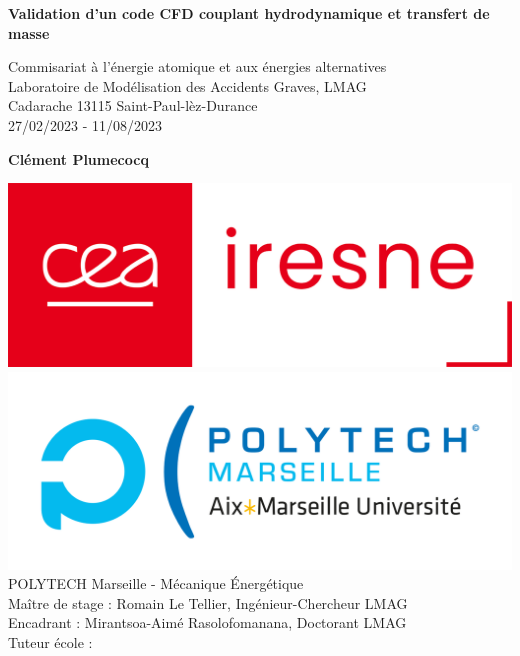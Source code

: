 \documentclass[a4paper,11pt,fleqn]{report}    %
\begin{document}

\hypersetup{pageanchor=false}
\begin{titlepage}
    \begin{center}
        \vspace*{1cm}

        \Huge
        \textbf{Validation d'un code CFD couplant hydrodynamique et transfert de masse}

        \vspace{0.5cm}
        \LARGE
        Commisariat à l'énergie atomique et aux énergies alternatives \\
        Laboratoire de Modélisation des Accidents Graves, LMAG\\
        \Large Cadarache 13115 Saint-Paul-lèz-Durance\\
         27/02/2023 - 11/08/2023
        \vspace{1.5cm}

        \textbf{\LARGE Clément Plumecocq}

        \vfill

        \includegraphics[scale=0.15]{logo_iresne.png}\includegraphics[scale=0.20]{polytech.jpg}
        \vfill
        \Large
        \noindent%
        POLYTECH Marseille - Mécanique Énergétique \\ \vfill
        Maître de stage : Romain Le Tellier, Ingénieur-Chercheur LMAG \\
        Encadrant : Mirantsoa-Aimé Rasolofomanana, Doctorant LMAG \\
        Tuteur école : 
    \end{center}
\end{titlepage}
\end{document}
